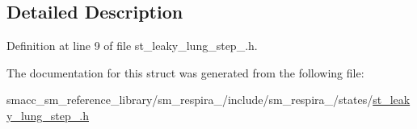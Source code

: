 \subsection{Detailed Description}


Definition at line 9 of file st\+\_\+leaky\+\_\+lung\+\_\+step\+\_.\+h.



The documentation for this struct was generated from the following file\+:\begin{DoxyCompactItemize}
\item 
smacc\+\_\+sm\+\_\+reference\+\_\+library/sm\+\_\+respira\+\_/include/sm\+\_\+respira\+\_/states/\hyperlink{st__leaky__lung__step__2_8h}{st\+\_\+leaky\+\_\+lung\+\_\+step\+\_.\+h}\end{DoxyCompactItemize}
